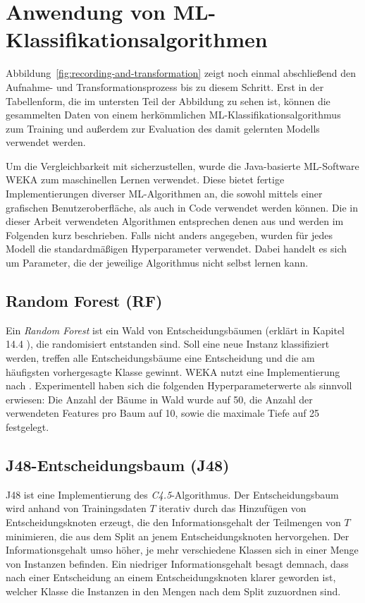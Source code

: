 \section{Anwendung von ML-Klassifikationsalgorithmen}
\label{section:ml-algos}
Abbildung~\ref{fig:recording-and-transformation} zeigt noch einmal abschließend den Aufnahme- und Transformationsprozess bis zu diesem Schritt. Erst in der Tabellenform, die im untersten Teil der Abbildung zu sehen ist, können die gesammelten Daten von einem herkömmlichen ML-Klassifikationsalgorithmus zum Training und außerdem zur Evaluation des damit gelernten Modells verwendet werden.

Um die Vergleichbarkeit mit \cite{Weiss2016} sicherzustellen, wurde die Java-basierte ML-Software WEKA zum maschinellen Lernen verwendet. Diese bietet fertige Implementierungen diverser ML-Algorithmen an, die sowohl mittels einer grafischen Benutzeroberfläche, als auch in Code verwendet werden können. Die in dieser Arbeit verwendeten Algorithmen entsprechen denen aus \cite{Weiss2016} und werden im Folgenden kurz beschrieben. Falls nicht anders angegeben, wurden für jedes Modell die standardmäßigen Hyperparameter verwendet. Dabei handelt es sich um Parameter, die der jeweilige Algorithmus nicht selbst lernen kann.
\subsection{Random Forest (RF)}
Ein \textit{Random Forest} ist ein Wald von Entscheidungsbäumen (erklärt in Kapitel 14.4 \cite{Bishop2006}), die randomisiert entstanden sind. Soll eine neue Instanz klassifiziert werden, treffen alle Entscheidungsbäume eine Entscheidung und die am häufigsten vorhergesagte Klasse gewinnt. WEKA nutzt eine Implementierung nach \cite{Breiman2001}. Experimentell haben sich die folgenden Hyperparameterwerte als sinnvoll erwiesen: Die Anzahl der Bäume in Wald wurde auf 50, die Anzahl der verwendeten Features pro Baum auf 10, sowie die maximale Tiefe auf 25 festgelegt.
\subsection{J48-Entscheidungsbaum (J48)}
J48 ist eine Implementierung des \textit{C4.5}-Algorithmus\cite{Quinlan1993}. Der Entscheidungsbaum wird anhand von Trainingsdaten $T$ iterativ durch das Hinzufügen von Entscheidungsknoten erzeugt, die den Informationsgehalt der Teilmengen von $T$ minimieren, die aus dem Split an jenem Entscheidungsknoten hervorgehen. Der Informationsgehalt umso höher, je mehr verschiedene Klassen sich in einer Menge von Instanzen befinden. Ein niedriger Informationsgehalt besagt demnach, dass nach einer Entscheidung an einem Entscheidungsknoten klarer geworden ist, welcher Klasse die Instanzen in den Mengen nach dem Split zuzuordnen sind.
